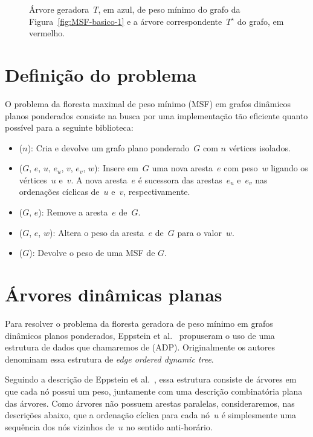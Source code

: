 \begin{figure}[htb]
\scalebox{1.5}{
\centering

}
\caption{Árvore geradora~$T$, em azul, de peso mínimo do grafo da Figura~\ref{fig:MSF-basico-1} e a árvore correspondente~$T^\star$ do grafo, em vermelho.}
\label{fig:MSF-figura-2}
\end{figure}





\section{Definição do problema}
\label{sec:definition-MSF}
O problema da floresta maximal de peso mínimo (MSF) em grafos dinâmicos planos ponderados consiste na busca por uma implementação tão eficiente quanto possível para a seguinte biblioteca:

\begin{itemize}
\item \MSFCreate($n$): Cria e devolve um grafo plano ponderado~$G$ com $n$ vértices isolados.
\item \MSFaddEdge($G$, $e$, $u$, $e_u$, $v$, $e_v$, $w$): Insere em~$G$ uma nova aresta~$e$ com peso~$w$ ligando os vértices~$u$ e~$v$. A nova aresta~$e$ é sucessora das arestas~$e_u$ e~$e_v$ nas ordenações cíclicas de~$u$ e~$v$, respectivamente.
\item \MSFdelEdge($G$, $e$): Remove a aresta~$e$ de~$G$.
\item \MSFupdate($G$, $e$, $w$): Altera o peso da aresta~$e$ de~$G$ para o valor~$w$.
\item \MSFweight($G$): Devolve o peso de uma MSF de $G$.
\end{itemize}


\section{Árvores dinâmicas planas}
\label{sec:EODT}

Para resolver o problema da floresta geradora de peso mínimo em grafos dinâmicos planos ponderados, Eppstein et al.~\cite{EPPSTEIN-planar} propuseram o uso de uma estrutura de dados que chamaremos de  (ADP). Originalmente os autores denominam essa estrutura de \textit{edge ordered dynamic tree}.

Seguindo a descrição de Eppstein et al.~\cite[Seção 3]{EPPSTEIN-planar}, essa estrutura consiste de árvores em que cada nó possui um peso, juntamente com uma descrição combinatória plana das árvores.
Como árvores não possuem arestas paralelas, consideraremos, nas descrições abaixo, que a ordenação cíclica para cada nó~$u$ é simplesmente uma sequência dos nós vizinhos de~$u$ no sentido anti-horário.

